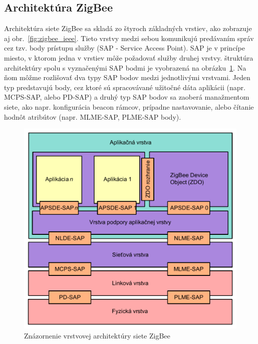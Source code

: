 \subsection{Architektúra ZigBee}
\indent\indent Architektúra siete ZigBee sa skladá zo štyroch základných vrstiev, ako zobrazuje aj obr.~\ref{fig:zigbee_ieee}. Tieto vrstvy medzi sebou komunikujú predávaním správ cez tzv. body prístupu služby (SAP - Service Access Point). SAP je v princípe miesto, v ktorom jedna v vrstiev môže požadovať služby druhej vrstvy. štruktúra architektúry spolu s vyznačenými SAP bodmi je vyobrazená na obrázku~\ref{fig:architecture_zigbee}. Na ňom môžme rozlišovať dva typy SAP bodov medzi jednotlivými vrstvami. Jeden typ predstavujú body, cez ktoré sú spracovávané užitočné dáta aplikácii (napr. MCPS-SAP, alebo PD-SAP) a druhý typ SAP bodov sa zaoberá manažmentom siete, ako napr. konfigurácia beacon rámcov, prípadne nastavovanie, alebo čítanie hodnôt atribútov (napr. MLME-SAP, PLME-SAP body).\\
\begin{figure}[htbp]
\begin{center}
\includegraphics[width=140mm]{figures/architecture_zigbee}
\caption{Znázornenie vrstvovej architektúry siete ZigBee}
\label{fig:architecture_zigbee}
\end{center}
\end{figure}
